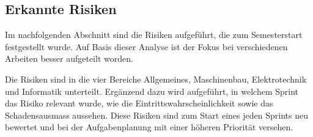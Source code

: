 \documentclass[main.tex]{subfiles} %
\begin{document}
\subsection*{Erkannte Risiken}

Im nachfolgenden Abschnitt sind die Risiken aufgeführt, die zum Semesterstart
festgestellt wurde. Auf Basis dieser Analyse ist der Fokus bei verschiedenen
Arbeiten besser aufgeteilt worden.

Die Risiken sind in die vier Bereiche Allgemeines, Maschinenbau, Elektrotechnik
und Informatik unterteilt. Ergänzend dazu wird aufgeführt, in welchem Sprint
das Risiko relevant wurde, wie die Eintrittswahrscheinlichkeit sowie das
Schadensausmass aussehen. Diese Risiken sind zum Start eines jeden Sprints neu
bewertet und bei der Aufgabenplanung mit einer höheren Priorität versehen.
\end{document}
